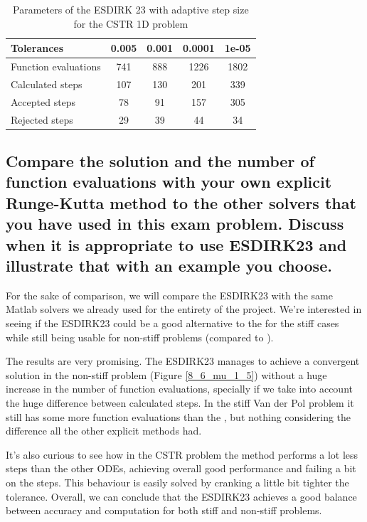 \begin{table}[H]
    \centering
    \begin{tabular}{@{}l|cccc@{}}
    \toprule
    Tolerances           & 0.005 & 0.001 & 0.0001 & 1e-05 \\ \midrule
    Function evaluations & 741   & 888   & 1226   & 1802  \\
    Calculated steps     & 107   & 130   & 201    & 339   \\
    Accepted steps       & 78    & 91    & 157    & 305   \\
    Rejected steps       & 29    & 39    & 44     & 34    \\ \bottomrule
    \end{tabular}
    \caption{Parameters of the ESDIRK 23 with adaptive step size for the CSTR 1D problem}
    \label{8_5_1D_tols_table}
\end{table}


\subsection{Compare the solution and the number of function evaluations with your own explicit Runge-Kutta method to the other solvers that you have used in this exam problem.  Discuss when it is appropriate to use ESDIRK23 and illustrate that with an example you choose.}

For the sake of comparison, we will compare the ESDIRK23 with the same Matlab solvers we already used for the entirety of the project. We're interested in seeing if the ESDIRK23 could be a good alternative to the  for the stiff cases while still being usable for non-stiff problems (compared to ).

The results are very promising. The ESDIRK23 manages to achieve a convergent solution in the non-stiff problem (Figure \ref{8_6_mu_1_5}) without a huge increase in the number of function evaluations, specially if we take into account the huge difference between calculated steps. In the stiff Van der Pol problem it still has some more function evaluations than the , but nothing considering the difference all the other explicit methods had.

It's also curious to see how in the CSTR problem the method performs a lot less steps than the other ODEs, achieving overall good performance and failing a bit on the steps. This behaviour is easily solved by cranking a little bit tighter the tolerance. Overall, we can conclude that the ESDIRK23 achieves a good balance between accuracy and computation for both stiff and non-stiff problems.

